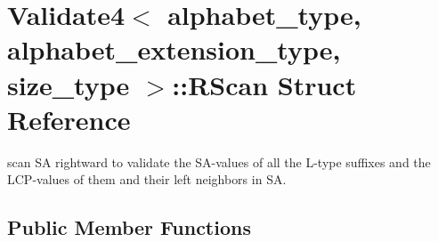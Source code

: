 \hypertarget{struct_validate4_1_1_r_scan}{}\section{Validate4$<$ alphabet\+\_\+type, alphabet\+\_\+extension\+\_\+type, size\+\_\+type $>$\+:\+:R\+Scan Struct Reference}
\label{struct_validate4_1_1_r_scan}


scan SA rightward to validate the S\+A-\/values of all the L-\/type suffixes and the L\+C\+P-\/values of them and their left neighbors in SA.  


\subsection*{Public Member Functions}
